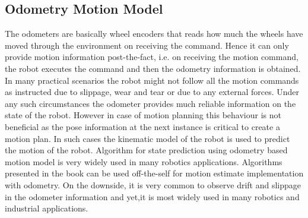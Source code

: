 \subsection{Odometry Motion Model}
The odometers are basically wheel encoders that reads how much the wheels have moved through the environment on receiving the command. Hence it can only provide motion information post-the-fact, i.e. on receiving the motion command, the robot executes the command and then the odometry information is obtained. In many practical scenarios the robot might not follow all the motion commands as instructed due to slippage, wear and tear or due to any external forces. Under any such circumstances the odometer provides much reliable information on the state of the robot. However in case of motion planning this behaviour is not beneficial as the pose information at the next instance is critical to create a motion plan. In such cases the kinematic model of the robot is used to predict the motion of the robot. Algorithm for state prediction using odometry based motion model is very widely used in many robotics applications. Algorithms presented in the book \cite{Thrun98aprobabilistic} can be used off-the-self for motion estimate implementation with odometry. On the downside, it is very common to observe drift and slippage in the odometer information and yet,it is most widely used in many robotics and industrial applications.

